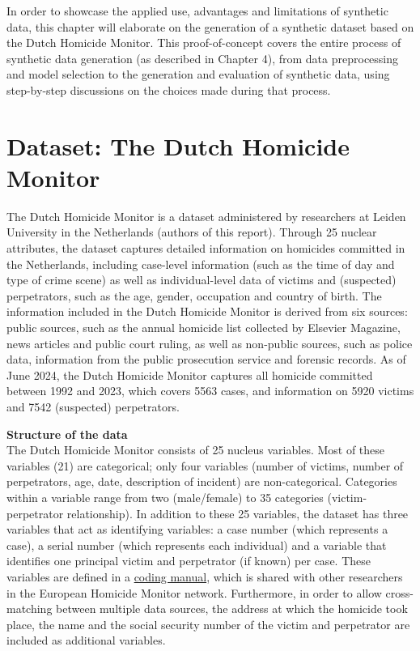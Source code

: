 
\label{proofofconcept}

In order to showcase the applied use, advantages and limitations of synthetic data, this chapter will elaborate on the generation of a synthetic dataset based on the Dutch Homicide Monitor. This proof-of-concept covers the entire process of synthetic data generation (as described in Chapter 4), from data preprocessing and model selection to the generation and evaluation of synthetic data, using step-by-step discussions on the choices made during that process. 

\section{Dataset: The Dutch Homicide Monitor}

The Dutch Homicide Monitor is a dataset administered by researchers at Leiden University in the Netherlands (authors of this report). Through 25 nuclear attributes, the dataset captures detailed information on homicides committed in the Netherlands, including case-level information (such as the time of day and type of crime scene) as well as individual-level data of victims and (suspected) perpetrators, such as the age, gender, occupation and country of birth. The information included in the Dutch Homicide Monitor is derived from six sources: public sources, such as the annual homicide list collected by Elsevier Magazine, news articles and public court ruling, as well as non-public sources, such as police data, information from the public prosecution service and forensic records. As of June 2024, the Dutch Homicide Monitor captures all homicide committed between 1992 and 2023, which covers 5563 cases, and information on 5920 victims and 7542 (suspected) perpetrators. 

\textbf{Structure of the data}\\
The Dutch Homicide Monitor consists of 25 nucleus variables. Most of these variables (21) are categorical; only four variables (number of victims, number of perpetrators, age, date, description of incident) are non-categorical. Categories within a variable range from two (male/female) to 35 categories (victim-perpetrator relationship). In addition to these 25 variables, the dataset has three variables that act as identifying variables: a case number (which represents a case), a serial number (which represents each individual) and a variable that identifies one principal victim and perpetrator (if known) per case. These variables are defined in a \href{https://www.universiteitleiden.nl/binaries/content/assets/governance-and-global-affairs/isga/dfvm---coding-manual-marieke-liem.pdf}{coding manual}, which is shared with other researchers in the European Homicide Monitor network. Furthermore, in order to allow cross-matching between multiple data sources, the address at which the homicide took place, the name and the social security number of the victim and perpetrator are included as additional variables.

